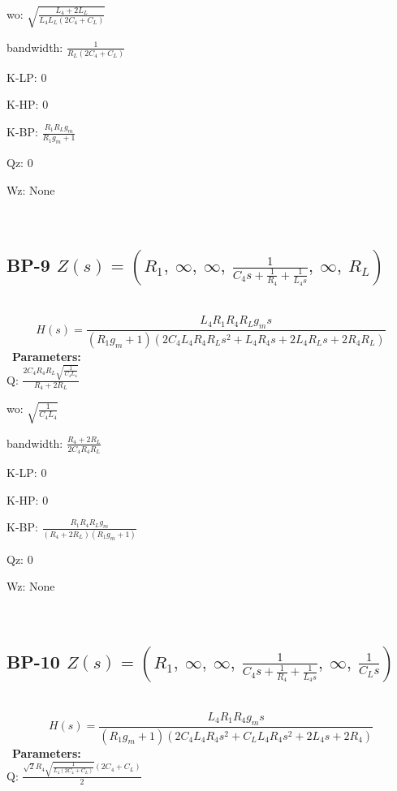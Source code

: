 \documentclass{article}
\begin{document}
wo: $\sqrt{\frac{L_{4} + 2 L_{L}}{L_{4} L_{L} \left(2 C_{4} + C_{L}\right)}}$\ 

bandwidth: $\frac{1}{R_{L} \left(2 C_{4} + C_{L}\right)}$\ 

K-LP: $0$\ 

K-HP: $0$\ 

K-BP: $\frac{R_{1} R_{L} g_{m}}{R_{1} g_{m} + 1}$\ 

Qz: $0$\ 

Wz: $\text{None}$\ 

\ 

\subsection{BP-9 $Z(s) = \left( R_{1}, \  \infty, \  \infty, \  \frac{1}{C_{4} s + \frac{1}{R_{4}} + \frac{1}{L_{4} s}}, \  \infty, \  R_{L}\right)$ } \ 
\textbf{\[H(s) = \frac{L_{4} R_{1} R_{4} R_{L} g_{m} s}{\left(R_{1} g_{m} + 1\right) \left(2 C_{4} L_{4} R_{4} R_{L} s^{2} + L_{4} R_{4} s + 2 L_{4} R_{L} s + 2 R_{4} R_{L}\right)}\] } \ 
\textbf{Parameters:}\\ 

Q: $\frac{2 C_{4} R_{4} R_{L} \sqrt{\frac{1}{C_{4} L_{4}}}}{R_{4} + 2 R_{L}}$\ 

wo: $\sqrt{\frac{1}{C_{4} L_{4}}}$\ 

bandwidth: $\frac{R_{4} + 2 R_{L}}{2 C_{4} R_{4} R_{L}}$\ 

K-LP: $0$\ 

K-HP: $0$\ 

K-BP: $\frac{R_{1} R_{4} R_{L} g_{m}}{\left(R_{4} + 2 R_{L}\right) \left(R_{1} g_{m} + 1\right)}$\ 

Qz: $0$\ 

Wz: $\text{None}$\ 

\ 

\subsection{BP-10 $Z(s) = \left( R_{1}, \  \infty, \  \infty, \  \frac{1}{C_{4} s + \frac{1}{R_{4}} + \frac{1}{L_{4} s}}, \  \infty, \  \frac{1}{C_{L} s}\right)$ } \ 
\textbf{\[H(s) = \frac{L_{4} R_{1} R_{4} g_{m} s}{\left(R_{1} g_{m} + 1\right) \left(2 C_{4} L_{4} R_{4} s^{2} + C_{L} L_{4} R_{4} s^{2} + 2 L_{4} s + 2 R_{4}\right)}\] } \ 
\textbf{Parameters:}\\ 

Q: $\frac{\sqrt{2} R_{4} \sqrt{\frac{1}{L_{4} \left(2 C_{4} + C_{L}\right)}} \left(2 C_{4} + C_{L}\right)}{2}$\ 
\end{document}
